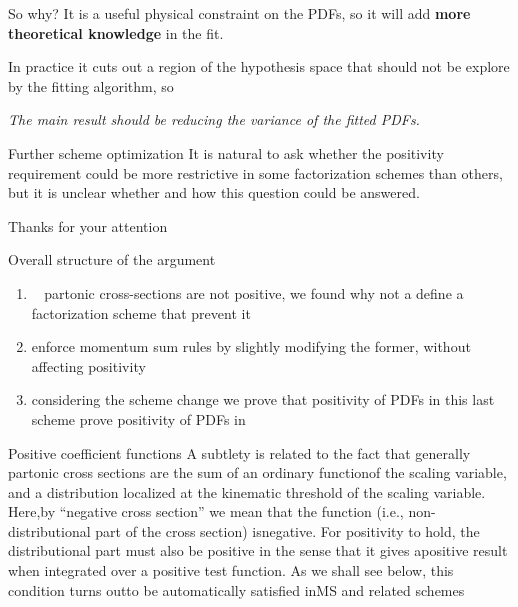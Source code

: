 \documentclass[9pt]{beamer}
\DeclareMathOperator{\msbar}{\overline{MS}}
\begin{document}
\begin{frame}{So why?}
    \vspace*{10pt}
    It is a useful physical constraint on the PDFs, so it will add
    \textbf{more theoretical knowledge} in the fit.

    In practice it cuts out a region of the hypothesis space that should not be
    explore by the fitting algorithm, so

    \begin{center}
        \textit{The main result should be reducing the variance of the fitted PDFs.}
    \end{center}

    \vspace*{25pt}
    \begin{block}{Further scheme optimization}
        It is natural to ask whether the positivity requirement could be more
        restrictive in some factorization schemes than others, but it is
        unclear  whether  and  how  this  question  could  be  answered.
    \end{block}
\end{frame}

\begin{frame}[standout]
    Thanks for your attention
\end{frame}

\appendix

\begin{frame}{Overall structure of the argument}
    \begin{enumerate}
        \item $\msbar$ partonic cross-sections are not positive, we found why
            not a define a factorization scheme that prevent it
        \item enforce momentum sum rules by slightly modifying the former,
            without affecting positivity
        \item considering the scheme change we prove that positivity of PDFs in
            this last scheme prove positivity of PDFs in $\msbar$
    \end{enumerate}
\end{frame}

\begin{frame}{Positive coefficient functions}
    A subtlety is related to the fact that generally partonic cross sections
    are the sum of an ordinary functionof the scaling variable, and a
    distribution localized at the kinematic threshold of the scaling variable.
    Here,by “negative cross section” we mean that the function (i.e.,
    non-distributional part of the cross section) isnegative.  For positivity
    to hold,  the distributional part must also be positive in the sense that
    it gives apositive result when integrated over a positive test function.
    As we shall see below, this condition turns outto be automatically
    satisfied inMS and related schemes
\end{frame}
\end{document}
